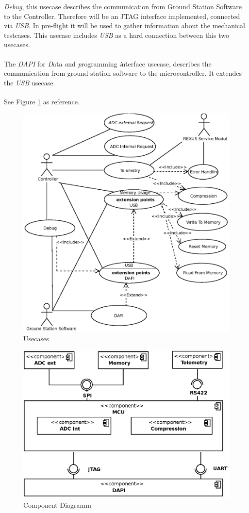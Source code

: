 \textit{Debug}, this usecase describes the communication from Ground Station Software to the Controller. Therefore will be an JTAG interface implemented, connected via \textit{USB}. In pre-flight it will be used to gather information about the mechanical testcases. This usecase includes \textit{USB} as a hard connection  between this two usecases. \\ \\
The \textit{DAPI} for \textit{D}ata \textit{a}nd \textit{p}rogramming  \textit{i}nterface usecase, describes the communication from ground station software to the microcontroller. It extendes the \textit{USB} usecase.\\ \\
See Figure \ref{fig:usecase} as reference. 
\pagebreak
\begin{figure}[H]
	\centering
	  \includegraphics{HERMESS_USECASE.eps}
	\caption{Usecases}
	\label{fig:usecase}
\end{figure}
\pagebreak
\begin{figure}[H]
	\centering
	\includegraphics{Components.eps}
	\caption{Component Diagramm}
\end{figure} \noindent
